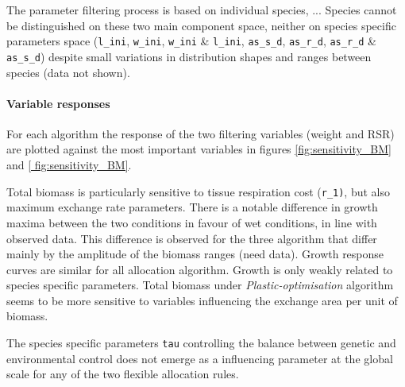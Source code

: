The parameter filtering process is based on individual species, ... Species cannot be distinguished on these two main component space, neither on species specific parameters space (\texttt{l\_ini}, \texttt{w\_ini}, \texttt{w\_ini} \& \texttt{l\_ini}, \texttt{as\_s\_d}, \texttt{as\_r\_d}, \texttt{as\_r\_d} \& \texttt{as\_s\_d}) despite small variations in distribution shapes and ranges between species (data not shown).\\

\paragraph{Variable responses}
For each algorithm the response of the two filtering variables (weight and RSR) are plotted against the most important variables in figures \ref{fig:sensitivity_BM} and \ref{ fig:sensitivity_BM}.

Total biomass is particularly sensitive to tissue respiration cost (\texttt{r\_1)}, but also maximum exchange rate parameters. There is a notable difference in growth maxima between the two conditions in favour of wet conditions, in line with observed data. This difference is observed for the three algorithm that differ mainly by the amplitude of the biomass ranges (need data).  Growth response curves are similar for all allocation algorithm. Growth is only weakly related to species specific parameters. Total biomass under \textit{Plastic-optimisation} algorithm seems to be more sensitive to variables influencing the exchange area per unit of biomass.

The species specific parameters \texttt{tau} controlling the balance between genetic and environmental control does not emerge as a influencing parameter at the global scale for any of the two flexible allocation rules.

